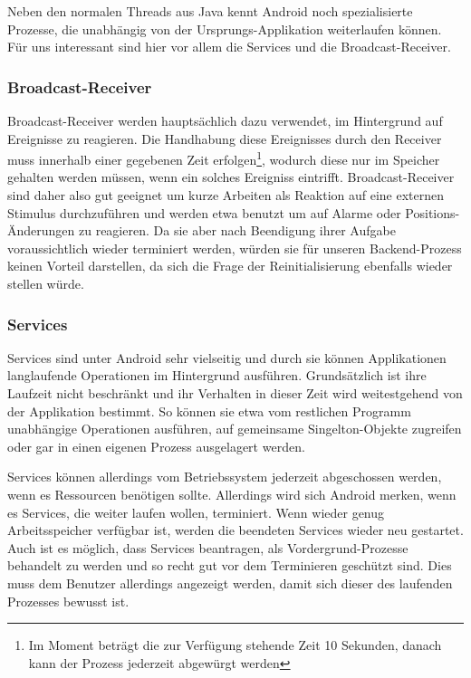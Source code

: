 Neben den normalen Threads aus Java kennt Android noch spezialisierte Prozesse, die unabhängig von der Ursprungs-Applikation weiterlaufen können. Für uns interessant sind hier vor allem die Services und die Broadcast-Receiver.

\subsubsection{Broadcast-Receiver}

Broadcast-Receiver werden hauptsächlich dazu verwendet, im Hintergrund auf Ereignisse zu reagieren. Die Handhabung diese Ereignisses durch den Receiver muss innerhalb einer gegebenen Zeit erfolgen\footnote{Im Moment beträgt die zur Verfügung stehende Zeit 10 Sekunden, danach kann der Prozess jederzeit abgewürgt werden\cite{adbmt}}, wodurch diese nur im Speicher gehalten werden müssen, wenn ein solches Ereigniss eintrifft. Broadcast-Receiver sind daher also gut geeignet um kurze Arbeiten als Reaktion auf eine externen Stimulus durchzuführen und werden etwa benutzt um auf Alarme oder Positions-Änderungen zu reagieren. Da sie aber nach Beendigung ihrer Aufgabe voraussichtlich wieder terminiert werden, würden sie für unseren Backend-Prozess keinen Vorteil darstellen, da sich die Frage der Reinitialisierung ebenfalls wieder stellen würde.

\subsubsection{Services}

Services sind unter Android sehr vielseitig und durch sie können Applikationen langlaufende Operationen im Hintergrund ausführen. Grundsätzlich ist ihre Laufzeit nicht beschränkt und ihr Verhalten in dieser Zeit wird weitestgehend von der Applikation bestimmt. So können sie etwa vom restlichen Programm unabhängige Operationen ausführen, auf gemeinsame Singelton-Objekte zugreifen oder gar in einen eigenen Prozess ausgelagert werden.

Services können allerdings vom Betriebssystem jederzeit abgeschossen werden, wenn es Ressourcen benötigen sollte. Allerdings wird sich Android merken, wenn es Services, die weiter laufen wollen, terminiert. Wenn wieder genug Arbeitsspeicher verfügbar ist, werden die beendeten Services wieder neu gestartet. Auch ist es möglich, dass Services beantragen, als Vordergrund-Prozesse behandelt zu werden und so recht gut vor dem Terminieren geschützt sind. Dies muss dem Benutzer allerdings angezeigt werden, damit sich dieser des laufenden Prozesses bewusst ist.


